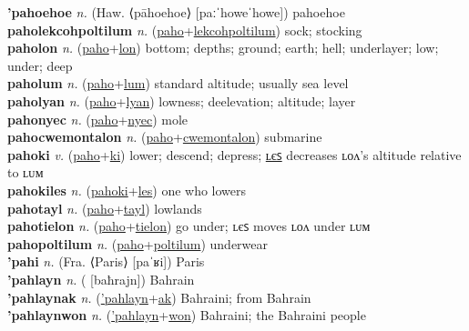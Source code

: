 \textbf{'pahoehoe} \textit{n.} (Haw. ⟨pāhoehoe⟩ [paːˈhoweˈhowe])
pahoehoe \label{'pahoehoe} \\
\textbf{paholekcohpoltilum} \textit{n.} (\hyperref[paho]{paho}+\hyperref[lekcohpoltilum]{lekcohpoltilum})
sock; stocking \label{paholekcohpoltilum} \\
\textbf{paholon} \textit{n.} (\hyperref[paho]{paho}+\hyperref[lon]{lon})
bottom; depths; ground; earth; hell; underlayer; low; under; deep \label{paholon} \\
\textbf{paholum} \textit{n.} (\hyperref[paho]{paho}+\hyperref[lum]{lum})
standard altitude; usually sea level \label{paholum} \\
\textbf{paholyan} \textit{n.} (\hyperref[paho]{paho}+\hyperref[lyan]{lyan})
lowness; deelevation; altitude; layer \label{paholyan} \\
\textbf{pahonyec} \textit{n.} (\hyperref[paho]{paho}+\hyperref[nyec]{nyec})
mole \label{pahonyec} \\
\textbf{pahocwemontalon} \textit{n.} (\hyperref[paho]{paho}+\hyperref[cwemontalon]{cwemontalon})
submarine \label{pahocwemontalon} \\
\textbf{pahoki} \textit{v.} (\hyperref[paho]{paho}+\hyperref[ki]{ki})
lower; descend; depress; \hyperref[pahokiles]{ʟєꜱ} decreases ʟᴏᴧ’s altitude relative to ʟᴜᴍ \label{pahoki} \\
\textbf{pahokiles} \textit{n.} (\hyperref[pahoki]{pahoki}+\hyperref[les]{les})
one who lowers \label{pahokiles} \\
\textbf{pahotayl} \textit{n.} (\hyperref[paho]{paho}+\hyperref[tayl]{tayl})
lowlands \label{pahotayl} \\
\textbf{pahotielon} \textit{n.} (\hyperref[paho]{paho}+\hyperref[tielon]{tielon})
go under; ʟєꜱ moves ʟᴏᴧ under ʟᴜᴍ \label{pahotielon} \\
\textbf{pahopoltilum} \textit{n.} (\hyperref[paho]{paho}+\hyperref[poltilum]{poltilum})
underwear \label{pahopoltilum} \\
\textbf{'pahi} \textit{n.} (Fra. ⟨Paris⟩ [paˈʁi])
Paris \label{'pahi} \\
\textbf{'pahlayn} \textit{n.} ( [baħrajn])
Bahrain \label{'pahlayn} \\
\textbf{'pahlaynak} \textit{n.} (\hyperref['pahlayn]{'pahlayn}+\hyperref[ak]{ak})
Bahraini; from Bahrain \label{'pahlaynak} \\
\textbf{'pahlaynwon} \textit{n.} (\hyperref['pahlayn]{'pahlayn}+\hyperref[won]{won})
Bahraini; the Bahraini people \label{'pahlaynwon} \\

